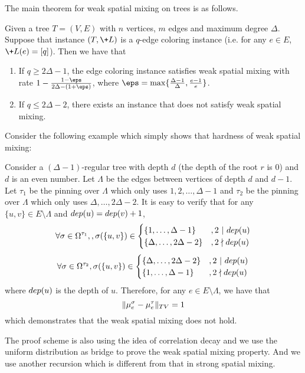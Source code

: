 \documentclass[a4paper,11pt]{article}
\begin{document}
The main theorem for weak spatial mixing on trees is as follows.
\begin{theorem}\label{thm:tight_WSM}
    Given a tree $T = (V,E)$ with $n$ vertices, $m$ edges and maximum degree $\Delta$.
    Suppose that instance $(T,\+L)$ is a $q$-edge coloring instance (i.e. for any $e\in E$, $\+L(e) = [q]$). 
    Then we have that
    \begin{enumerate}
        \item If $q \geq 2\Delta - 1$, the edge coloring instance satisfies weak spatial mixing with rate $1 - \frac{1 - \eps}{2\Delta - (1+\eps)}$, where $\eps = \max\{\frac{\Delta - 1}{\Delta}, \frac {e - 1}e\}$.
        \item If $q \leq 2\Delta - 2$, there exists an instance that does not satisfy weak spatial mixing.
    \end{enumerate}
\end{theorem}
Consider the following example which simply shows that hardness of weak spatial mixing:
\begin{example}\label{eg:hardness_WSM}
    Consider a $(\Delta - 1)$-regular tree with depth $d$ (the depth of the root $r$ is $0$) and $d$ is an even number. Let $\Lambda$ be the edges between vertices of depth $d$ and $d-1$. Let $\tau_1$ be the pinning over $\Lambda$ which only uses $1,2,\dots,\Delta-1$ and $\tau_2$ be the pinning over $\Lambda$ which only uses $\Delta,\dots,2\Delta - 2$. It is easy to verify that for any $\{u,v\}\in E\setminus \Lambda$ and $\-{dep}(u) = \-{dep}(v) + 1$,
    $$
        \forall \sigma \in \Omega^{\tau_1}, , \sigma(\{u,v\}) \in 
        \begin{cases}
            \{1,\dots,\Delta-1\} &, 2\ |\ \-{dep}(u)
            \\\{\Delta,\dots,2\Delta-2\} &, 2 \nmid \-{dep}(u)
        \end{cases}
    $$
    $$
        \forall \sigma \in \Omega^{\tau_2}, \sigma(\{u,v\}) \in 
        \begin{cases}
            \{\Delta,\dots,2\Delta-2\} &, 2\ |\ \-{dep}(u)
            \\\{1,\dots,\Delta-1\} &, 2 \nmid \-{dep}(u)
        \end{cases}
    $$
    where $\-{dep}(u)$ is the depth of $u$. Therefore, for any $e\in E\setminus \Lambda$, we have that
    $$
        \|\mu_e^\sigma - \mu_e^\tau\|_{\-{TV}} = 1
    $$
    which demonstrates that the weak spatial mixing does not hold.
\end{example}
The proof scheme is also using the idea of correlation decay and we use the uniform distribution as bridge to prove the weak spatial mixing property. And we use another recursion which is different from that in strong spatial mixing.
\end{document}
